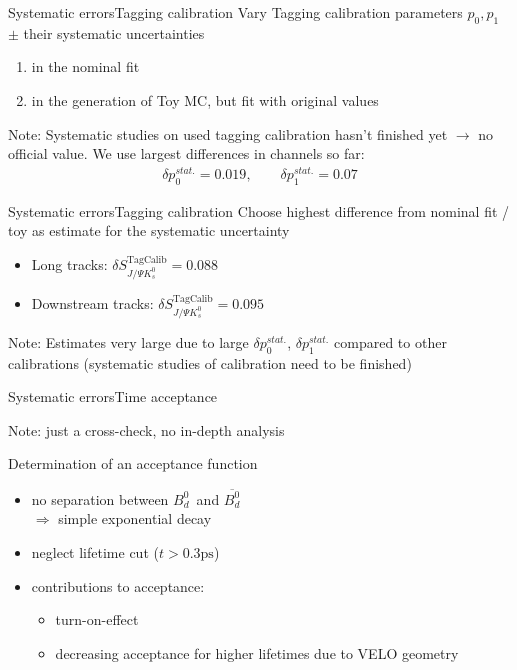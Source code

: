 \documentclass{beamer}
\newcommand{\Bd}{$B_d^0$}
\newcommand{\Bdbar}{$\overline{B_d^0}$}
\newcommand{\SJPsi}{S_{J/\Psi K_s^0}}
\begin{document}
	\begin{frame}{Systematic errors}{Tagging calibration}
	Vary Tagging calibration parameters $p_0, p_1$ $\pm$ their systematic uncertainties
	\begin{enumerate}
	\item in the nominal fit
	\item in the generation of Toy MC, but fit with original values
	\end{enumerate}
	\begin{alert}{Note:}
	Systematic studies on used tagging calibration hasn't finished yet $\longrightarrow$ no official value. We use largest differences in channels so far:
	\begin{align*}
	\delta p_0^{stat.} = 0.019, \qquad \delta p_1^{stat.} = 0.07
	\end{align*}
	\end{alert}
	\end{frame}
	
	\begin{frame}{Systematic errors}{Tagging calibration}
	Choose highest difference from nominal fit / toy as estimate for the systematic uncertainty
	\begin{itemize}
	\item Long tracks: $\delta\SJPsi^{\text{TagCalib}} = 0.088$
	\item Downstream tracks: $\delta\SJPsi^{\text{TagCalib}} = 0.095$
    \end{itemize}		    
    \begin{alert}{Note:}
    Estimates very large due to large $\delta p_0^{stat.}$, $\delta p_1^{stat.}$ compared to other calibrations (systematic studies of calibration need to be finished)
    \end{alert}
    \end{frame}
    
    \begin{frame}{Systematic errors}{Time acceptance}
    \begin{alert}{Note:}
    just a cross-check, no in-depth analysis
    \end{alert}
    \begin{block}{Determination of an acceptance function}
    \begin{itemize}
    \item no separation between \Bd \ and \Bdbar \\
          $\Rightarrow$ simple exponential decay
    \item neglect lifetime cut ($t > 0.3\text{ps}$)
    \item contributions to acceptance:
          \begin{itemize}
          \item turn-on-effect
          \item decreasing acceptance for higher lifetimes due to VELO geometry
          \end{itemize}
    \end{itemize}
    \end{block}
\end{frame}
\end{document}
